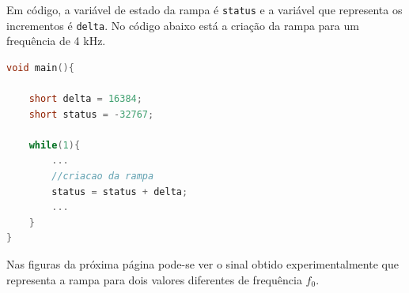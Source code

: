 \documentclass[11pt]{article}
\numberwithin{equation}{section}
\begin{document}
Em código, a variável de estado da rampa é \texttt{status} e a variável que representa os incrementos é \texttt{delta}. No código abaixo está a criação da rampa para um frequência de 4 kHz.

\begin{lstlisting}[language=C]
void main(){

	short delta = 16384;
	short status = -32767;

	while(1){
		...	
		//criacao da rampa	
		status = status + delta;
		...
	}
}
\end{lstlisting}

Nas figuras da próxima página pode-se ver o sinal obtido experimentalmente que representa a rampa para dois valores diferentes de frequência $f_{0}$.

\begin{figure}[H]
	\centering
	\hspace{8mm}

\end{figure}
\end{document}
